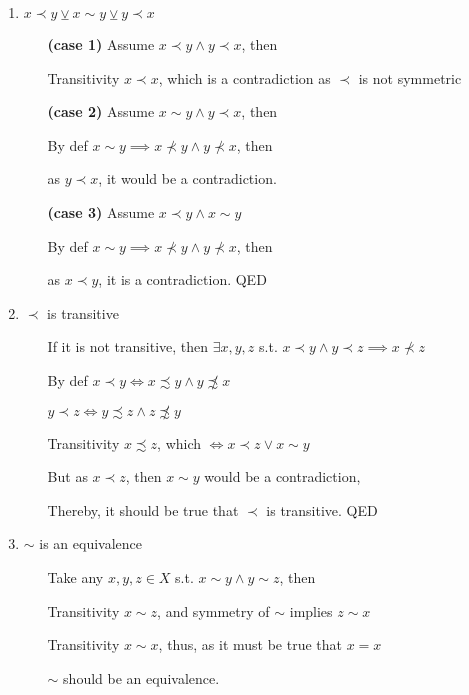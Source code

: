 \documentclass{article}
\begin{document}
\begin{enumerate}
\item $x\prec y \veebar x\sim y \veebar y\prec x$
\begin{enumerate}
\item[\bf (case 1)] Assume $x\prec y\wedge y\prec x$, then
\item[Transitivity] $x\prec x$, which is a contradiction as $\prec$ is not symmetric
\item[\bf (case 2)] Assume $x\sim y \wedge y\prec x$, then
\item[By def] $x\sim y\implies x\not\prec y \wedge y\not\prec x$, then
\item[] as $y\prec x$, it would be a contradiction.
\item[\bf (case 3)] Assume $x\prec y \wedge x\sim y$
\item[By def] $x\sim y\implies x\not\prec y \wedge y\not\prec x$, then
\item[] as $x\prec y$, it is a contradiction. QED
\end{enumerate}

\item $\prec$ is transitive
\begin{enumerate}
\item[] If it is not transitive, then $\exists x,y,z$ s.t. $x\prec y\wedge y\prec
z \implies x\not\prec z$
\item[By def] $x\prec y\iff x\precsim y \wedge y\not\precsim x$
\item[] $y\prec z\iff y\precsim z \wedge z\not\precsim y$
\item[Transitivity] $x\precsim z$, which $\iff x\prec z \vee x\sim y$
\item[] But as $x\prec z$, then $x\sim y$ would be a contradiction,
\item[] Thereby, it should be true that $\prec$ is transitive. QED
\end{enumerate}

\item $\sim$ is an equivalence
\begin{enumerate}
\item[] Take any $x,y,z\in X$ s.t. $x\sim y \wedge y\sim z$, then
\item[Transitivity] $x\sim z$, and symmetry of $\sim$ implies $z\sim x$
\item[Transitivity] $x\sim x$, thus, as it must be true that $x=x$
\item[] $\sim$ should be an equivalence.
\end{enumerate}


\end{enumerate}
\end{document}
